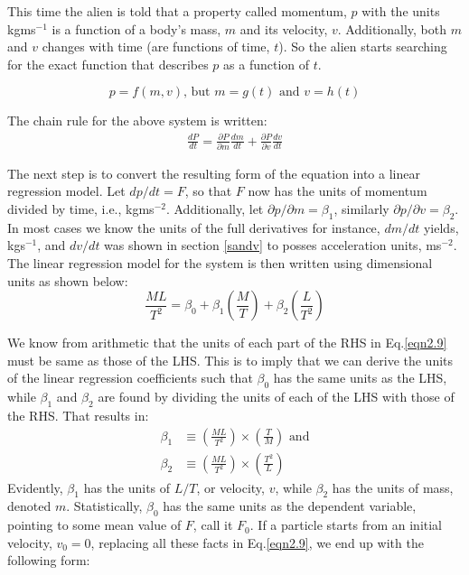 \noindent This time the alien is told that a property called momentum, $p$ with the units kgms$^{-1}$ is a function of a body's mass, $m$ and its velocity, $v$. Additionally, both $m$ and $v$ changes with time (are functions of time, $t$). So the alien starts searching for the exact function that describes $p$ as a function of $t$.

\begin{equation}
p = f\left(m,v\right) \text{, but }
m = g\left(t\right) \text{ and }
v = h\left(t\right)
\label{eqn2.7}
\end{equation}

\noindent The chain rule for the above system is written:
\begin{eqnarray}
\frac{dP}{dt} = \frac{\partial P}{\partial m}\frac{dm}{dt} +\frac{\partial P}{\partial v}\frac{dv}{dt}
\label{eqn2.8}
\end{eqnarray}

\noindent The next step is to convert the resulting form of the equation into a linear regression model. Let $dp/dt = F$, so that $F$ now has the units of momentum divided by time, i.e., kgms$^{-2}$. Additionally, let $\partial p/\partial m = \beta_1$, similarly $\partial p/\partial v = \beta_2$. In most cases we know the units of the full derivatives for instance, $dm/dt$ yields, kgs$^{-1}$, and $dv/dt$ was shown in section \ref{sandv} to posses acceleration units, ms$^{-2}$. The linear regression model for the system is then written using dimensional units as shown below: 
\begin{equation}
\frac{ML}{T^2} = \beta_0 + \beta_1\left( \frac{M}{T}\right)  + \beta_2\left( \frac{L}{T^2}\right) 
\label{eqn2.9}
\end{equation}  

\noindent We know from arithmetic that the units of each part of the RHS in Eq.\eqref{eqn2.9} must be same as those of the LHS. This is to imply that we can derive the units of the linear regression coefficients such that $\beta_0$ has the same units as the LHS, while $\beta_1$ and $\beta_2$ are found by dividing the units of each of the LHS with those of the RHS. That results in:
\begin{align*}
\beta_1 & \equiv \left( \frac{ML}{T^2}\right) \times \left( \frac{T}{M}\right)  \text{ and} \\
\beta_2 & \equiv \left( \frac{ML}{T^2}\right) \times \left( \frac{T^2}{L}\right) 
\end{align*}   
\noindent Evidently, $\beta_1$ has the units of $L/T$, or velocity, $v$, while $\beta_2$ has the units of mass, denoted $m$. Statistically, $\beta_0$ has the same units as the dependent variable, pointing to some mean value of $F$, call it $F_0$. If a particle starts from an initial velocity, $v_0=0$, replacing all these facts in Eq.\eqref{eqn2.9}, we end up with the following form:

